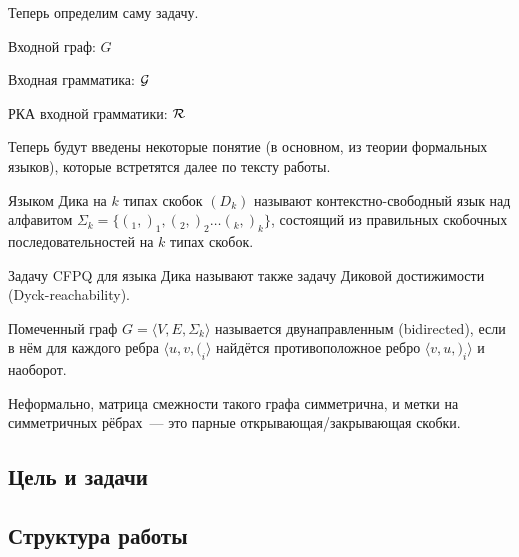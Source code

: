 Теперь определим саму задачу.

\begin{definition}
    Входной граф: $G$

    Входная грамматика: $\mathcal{G}$

    РКА входной грамматики: $\mathcal{R}$


\end{definition}

Теперь будут введены некоторые понятие (в основном, из теории формальных языков), которые встретятся далее по тексту работы.

\begin{definition}
    Языком Дика на $k$ типах скобок $(D_k)$ называют контекстно-свободный язык над алфавитом $\Sigma_k = \{ (_1, )_1, (_2, )_2 \dots (_k, )_k \}$, состоящий из правильных скобочных последовательностей на $k$ типах скобок.

    Задачу CFPQ для языка Дика называют также задачу Диковой достижимости (Dyck-reachability).
\end{definition}

\begin{definition}
    Помеченный граф $G = \langle V, E, \Sigma_k \rangle$ называется двунаправленным (bidirected), если в нём для каждого ребра $\langle u, v, (_i \rangle$ найдётся противоположное ребро $\langle v, u, )_i \rangle$ и наоборот.

    Неформально, матрица смежности такого графа симметрична, и метки на симметричных рёбрах~--- это парные открывающая/закрывающая скобки.
\end{definition}

\begin{definition}

\end{definition}

\subsection*{Цель и задачи}



\subsection*{Структура работы}